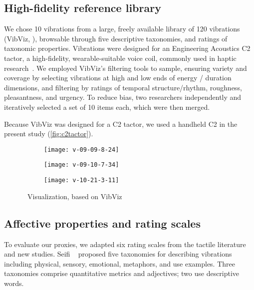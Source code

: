 \subsection{High-fidelity reference library}
We chose 10 vibrations from a large, freely available library of 120 vibrations (VibViz, \cite{Seifi2015}), browsable through five descriptive taxonomies, and ratings of taxonomic properties. Vibrations were designed for an Engineering Acoustics C2 tactor, a high-fidelity, wearable-suitable voice coil, commonly used in haptic research~\cite{Seifi2015}.
We employed VibViz's filtering tools to sample, ensuring variety and coverage by selecting vibrations at  high and low ends of energy / duration dimensions, and filtering by ratings of temporal structure/rhythm, roughness, pleasantness, and urgency.
To reduce bias, two researchers independently and iteratively selected a set of 10 items each, which were then merged.

Because VibViz was designed for a C2 tactor, we used a handheld C2 in the present study (\autoref{fig:c2tactor}).

       \begin{figure}
        \centering
        \begin{subfigure}{0.15\textwidth}
            \centering
            \texttt{[image: v-09-09-8-24]}
        \end{subfigure}
        \begin{subfigure}{0.15\textwidth}
            \centering
            \texttt{[image: v-09-10-7-34]}
        \end{subfigure}
        \begin{subfigure}{0.15\textwidth}
            \centering
            \texttt{[image: v-10-21-3-11]}
        \end{subfigure}
        \caption{\original~Visualization, based on VibViz}
        \label{fig:vis:original}
    \end{figure}

\subsection{Affective properties and rating scales} 
To evaluate our proxies, we adapted six rating scales from the tactile literature and new studies.
%
Seifi \etal~\cite{Seifi2015} proposed five taxonomies for describing vibrations including  physical, sensory, emotional, metaphors, and use examples.
Three taxonomies comprise quantitative metrics and adjectives; two use descriptive words. 

